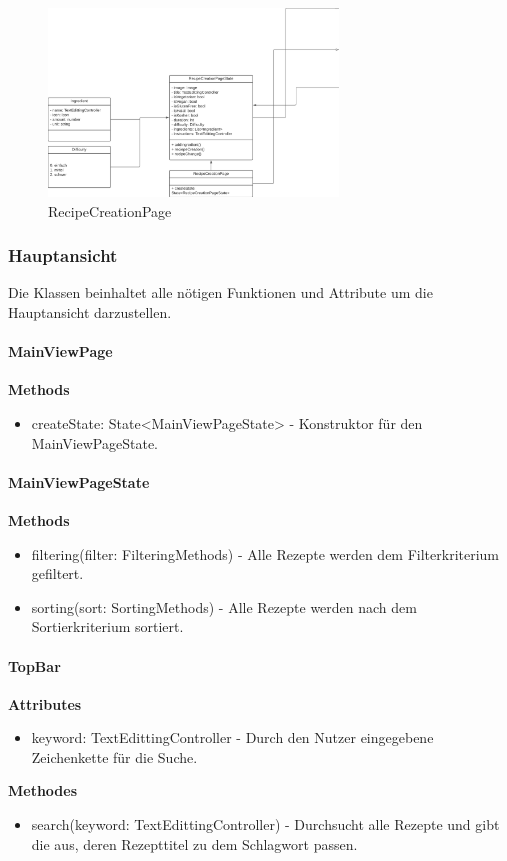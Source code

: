 \documentclass[parskip=full]{scrartcl}
\begin{document}
\begin{figure}[htp]
    \centering
    \includegraphics[height = 50mm]{images/presentationLayer/recipeCreationPage.png}
    \caption{RecipeCreationPage}
\end{figure}


\newpage

\subsubsection{Hauptansicht}
Die Klassen beinhaltet alle nötigen Funktionen und Attribute um die Hauptansicht darzustellen.\newline

\paragraph{MainViewPage}
\textbf{Methods}
\begin{itemize}
    \item createState: State<MainViewPageState> - Konstruktor für den MainViewPageState.
\end{itemize}

\paragraph{MainViewPageState}
\textbf{Methods}
\begin{itemize}
    \item filtering(filter: FilteringMethods) - Alle Rezepte werden dem Filterkriterium gefiltert.
    \item sorting(sort: SortingMethods) - Alle Rezepte werden nach dem Sortierkriterium sortiert.
\end{itemize}

\paragraph{TopBar}
\textbf{Attributes}
\begin{itemize}
    \item keyword: TextEdittingController - Durch den Nutzer eingegebene Zeichenkette für die Suche.
\end{itemize}
\textbf{Methodes}
\begin{itemize}
    \item search(keyword: TextEdittingController) - Durchsucht alle Rezepte und gibt die aus, deren Rezepttitel zu dem Schlagwort passen.
\end{itemize}
\end{document}
